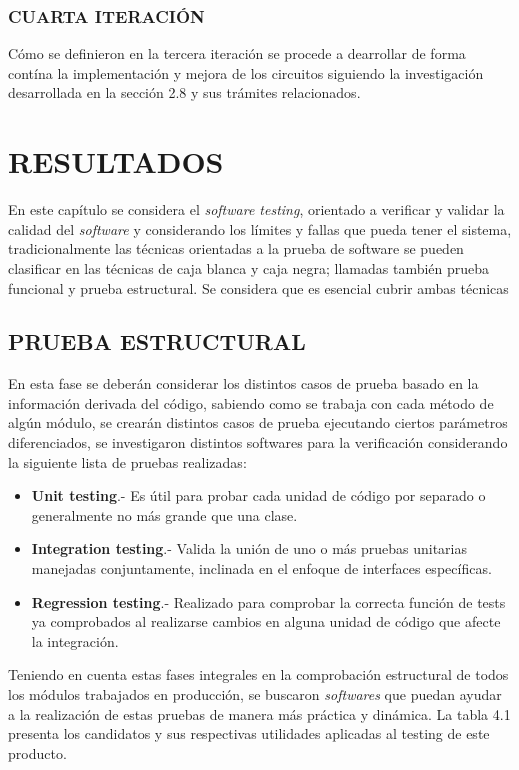 \documentclass[letter, openright, 12pt]{book}
\begin{document}
{\begin{enumerate}[label=(\alph*)]
\end{enumerate}

\subsection{CUARTA ITERACIÓN}

Cómo se definieron en la tercera iteración se procede a dearrollar de forma contína la implementación y mejora de los circuitos siguiendo la investigación desarrollada en la sección 2.8 y sus trámites relacionados. 

\chapter{RESULTADOS}

En este capítulo se considera el \textit{software testing}, orientado a verificar y validar la calidad del \textit{software} y considerando los límites y fallas que pueda tener el sistema, tradicionalmente las técnicas orientadas a la prueba de software se pueden clasificar en las técnicas de caja blanca y caja negra; llamadas también prueba funcional y prueba estructural. Se considera que es esencial cubrir ambas técnicas 

\section{PRUEBA ESTRUCTURAL}
En esta fase se deberán considerar los distintos casos de prueba basado en la información derivada del código, sabiendo como se trabaja con cada método de algún módulo, se crearán distintos casos de prueba ejecutando ciertos parámetros diferenciados, se investigaron distintos softwares para la verificación considerando la siguiente lista de pruebas realizadas:
\begin{itemize}
\item \textbf{Unit testing}.- Es útil para probar cada unidad de código por separado o generalmente no más grande que una clase. 
\item \textbf{Integration testing}.- Valida la unión de uno o más pruebas unitarias manejadas conjuntamente, inclinada en el enfoque de interfaces específicas. 
\item \textbf{Regression testing}.-  Realizado para comprobar la correcta función de tests ya comprobados al realizarse cambios en alguna unidad de código que afecte la integración.
\end{itemize}

Teniendo en cuenta estas fases integrales en la comprobación estructural de todos los módulos trabajados en producción, se buscaron \textit{softwares} que puedan ayudar a la realización de estas pruebas de manera más práctica y dinámica. La tabla 4.1 presenta los candidatos y sus respectivas utilidades aplicadas al testing de este producto. 

}
\end{document}
